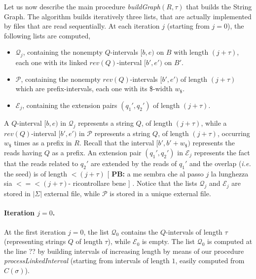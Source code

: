 \documentclass[runningheads,envcountsame,a4paper]{llncs}
\newcommand{\notaestesa}[2]{%
 \marginpar{\color{red!75!black}\textbf{\texttimes}}%
 {\color{red!75!black}%
 [\,\textbullet\,\textsf{\textbf{#1:}} %
 \textsf{\footnotesize#2}\,\textbullet\,]}%
}
\newcommand{\ie}{\textit{i.e.}\xspace}
\begin{document}
Let us now describe the main procedure \emph{buildGraph$(R, \tau)$} that
builds the String Graph.
The algorithm builds iteratively three lists,
that are actually implemented by files that are read sequentially.
At each iteration $j$ (starting from $j=0$), the following lists are computed,
\begin{itemize}
\item $\mathcal{Q}_j$, containing the nonempty $Q$-intervals $[b, e)$ on $B$ with length $(j+\tau)$,
each one with its linked
  $rev(Q)$-interval $[b', e')$ on $B'$.
\item $\mathcal{P}$, containing the nonempty $rev(Q)$-intervals $[b', e')$ of
  length $(j+\tau)$ which are prefix-intervals, each one with its \$-width $w_{\$}$.
\item $\mathcal{E}_j$, containing the extension pairs $(q_{1}', q_{2}')$ of
  length $(j+\tau)$. %
\end{itemize}

A $Q$-interval  $[b,e)$ in $\mathcal{Q}_j$ represents a
string $Q$, of length $(j+\tau)$, while
a $rev(Q)$-interval  $[b',e')$ in $\mathcal{P}$ represents a
string $Q$, of length $(j+\tau)$, occurring $w_\$$ times as a prefix in $R$.
Recall that the interval $[b',b'+w_\$)$ represents the reads having $Q$ as
a prefix. An extension pair $(q_{1}', q_{2}')$ in $\mathcal{E}_j$ represents the fact that the reads related to $q_{2}'$ are extended by the reads of $q_{1}'$ and the overlap (\ie the seed) is of length $<(j+\tau)$ \notaestesa{PB}{a me sembra che al passo $j$ la lunghezza sia $< =< (j+\tau)$- ricontrollare bene}.
Notice that the lists $\mathcal{Q}_j$ and  $\mathcal{E}_j$ are stored in $|\Sigma|$ external file, while $\mathcal{P}$ is stored in a unique external file.



\paragraph{Iteration $j = 0$.}

At the first iteration $j=0$, the list $\mathcal{Q}_0$ contains the
$Q$-intervals of length $\tau$ (representing strings $Q$ of length $\tau$), while  $\mathcal{E}_0$ is  empty. The list $\mathcal{Q}_0$ is computed at the line ?? by building intervals of increasing length by means of our procedure \emph{processLinkedInterval} (starting from intervals of length $1$, easily computed from $C(\sigma)$).
\end{document}
